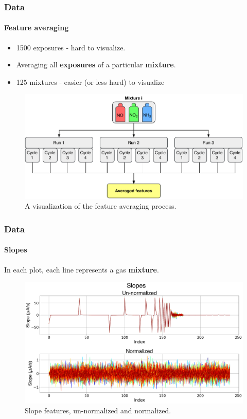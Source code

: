\documentclass{beamer}
\begin{document}
\begin{frame}
	\frametitle{Data}
	\framesubtitle{Feature averaging}
	
	\begin{itemize}
		\item 1500 exposures - hard to visualize.
		\item Averaging all \textbf{exposures} of a particular \textbf{mixture}.
		
	
	\item 125 mixtures - easier (or less hard) to visualize
	\end{itemize}

	\begin{figure}[h]
	\centering
	\includegraphics[width=1\textwidth]{../../figures/averaging-process.pdf}
	\caption{A visualization of the feature averaging process.}
	\label{fig:averaging-process}
\end{figure}
\end{frame}

\begin{frame}
	\frametitle{Data}
	\framesubtitle{Slopes}
		In each plot, each line represents a gas \textbf{mixture}.
		\begin{figure}[b]
			\includegraphics[width=1\linewidth]{../../figures/slopes.png}
			\caption{Slope features, un-normalized and normalized.}
			\label{fig:slopes} 
		\end{figure}
	
\end{frame}
\end{document}
